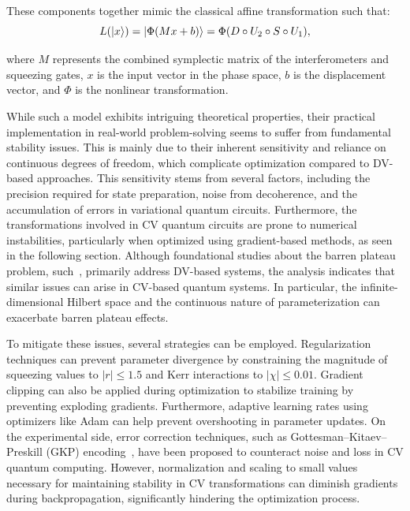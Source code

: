 These components together mimic the classical affine transformation such that:
\begin{equation}
    L(\ket{x}) = \ket{\Phi(Mx + b)} =  \Phi(D \circ U_2 \circ S \circ U_1),
\label{eq:affine_transform}
\end{equation}

where \(M\) represents the combined symplectic matrix of the interferometers and squeezing gates, \(x\) is the input vector in the phase space, $b$ is the displacement vector, and \(\Phi\) is the nonlinear transformation. 

While such a model exhibits intriguing theoretical properties, their practical implementation in real-world problem-solving seems to suffer from fundamental stability issues. This is mainly due to their inherent sensitivity and reliance on continuous degrees of freedom, which complicate optimization compared to DV-based approaches. This sensitivity stems from several factors, including the precision required for state preparation, noise from decoherence, and the accumulation of errors in variational quantum circuits. Furthermore, the transformations involved in CV quantum circuits are prone to numerical instabilities, particularly when optimized using gradient-based methods, as seen in the following section. Although foundational studies about the barren plateau problem, such~\cite{mcclean2018barren,cerezo2021cost,holmes2022connecting}, primarily address DV-based systems, the analysis indicates that similar issues can arise in CV-based quantum systems. In particular, the infinite-dimensional Hilbert space and the continuous nature of parameterization can exacerbate barren plateau effects. 


To mitigate these issues, several strategies can be employed. Regularization techniques can prevent parameter divergence by constraining the magnitude of squeezing values to $|r| \leq 1.5$ and Kerr interactions to $|\chi| \leq 0.01$. Gradient clipping can also be applied during optimization to stabilize training by preventing exploding gradients. Furthermore, adaptive learning rates using optimizers like Adam can help prevent overshooting in parameter updates. On the experimental side, error correction techniques, such as Gottesman–Kitaev–Preskill (GKP) encoding~\cite{gottesman2001encoding}, have been proposed to counteract noise and loss in CV quantum computing. However, normalization and scaling to small values necessary for maintaining stability in CV transformations can diminish gradients during backpropagation, significantly hindering the optimization process.




